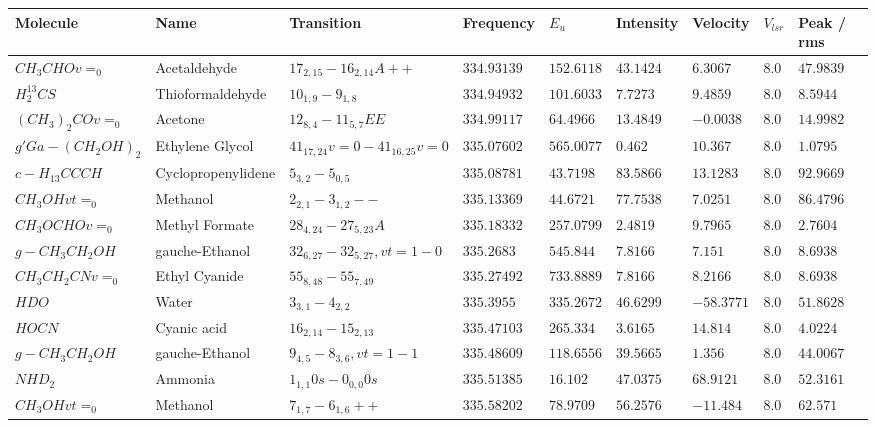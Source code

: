 \documentclass[10pt]{article}
\begin{document}
\begin{landscape}
\begin{table}[htb]
\small
    \centering    
    \begin{tabular}{l l l l l l l l l} 
\hline
Molecule & Name & Transition & Frequency & $E_{{u}}$ & Intensity & Velocity & $V_{{lsr}}$ & Peak / rms \\
\hline
$CH_{3}CHOv=_{0}$ & Acetaldehyde & $17_{2,15}-16_{2,14}A++$ & $334.93139$ & $152.6118$ & $43.1424$ & $6.3067$ & $8.0$ & $47.9839$\\
$H_{2}^{13}CS$ & Thioformaldehyde & $10_{1,9}-9_{1,8}$ & $334.94932$ & $101.6033$ & $7.7273$ & $9.4859$ & $8.0$ & $8.5944$\\
$(CH_{3})_{2}COv=_{0}$ & Acetone & $12_{8,4}-11_{5,7}EE$ & $334.99117$ & $64.4966$ & $13.4849$ & $-0.0038$ & $8.0$ & $14.9982$\\
$g'Ga-(CH_{2}OH)_{2}$ & Ethylene Glycol & $41_{17,24}v=0-41_{16,25}v=0$ & $335.07602$ & $565.0077$ & $0.462$ & $10.367$ & $8.0$ & $1.0795$\\
$c-H_{13}CCCH$ & Cyclopropenylidene & $5_{3,2}-5_{0,5}$ & $335.08781$ & $43.7198$ & $83.5866$ & $13.1283$ & $8.0$ & $92.9669$\\
$CH_{3}OHvt=_{0}$ & Methanol & $2_{2,1}-3_{1,2}--$ & $335.13369$ & $44.6721$ & $77.7538$ & $7.0251$ & $8.0$ & $86.4796$\\
$CH_{3}OCHOv=_{0}$ & Methyl Formate & $28_{4,24}-27_{5,23}A$ & $335.18332$ & $257.0799$ & $2.4819$ & $9.7965$ & $8.0$ & $2.7604$\\
$g-CH_{3}CH_{2}OH$ & gauche-Ethanol & $32_{6,27}-32_{5,27},vt=1-0$ & $335.2683$ & $545.844$ & $7.8166$ & $7.151$ & $8.0$ & $8.6938$\\
$CH_{3}CH_{2}CNv=_{0}$ & Ethyl Cyanide & $55_{8,48}-55_{7,49}$ & $335.27492$ & $733.8889$ & $7.8166$ & $8.2166$ & $8.0$ & $8.6938$\\
$HDO$ & Water & $3_{3,1}-4_{2,2}$ & $335.3955$ & $335.2672$ & $46.6299$ & $-58.3771$ & $8.0$ & $51.8628$\\
$HOCN$ & Cyanic acid & $16_{2,14}-15_{2,13}$ & $335.47103$ & $265.334$ & $3.6165$ & $14.814$ & $8.0$ & $4.0224$\\
$g-CH_{3}CH_{2}OH$ & gauche-Ethanol & $9_{4,5}-8_{3,6},vt=1-1$ & $335.48609$ & $118.6556$ & $39.5665$ & $1.356$ & $8.0$ & $44.0067$\\
$NHD_{2}$ & Ammonia & $1_{1,1}0s-0_{0,0}0s$ & $335.51385$ & $16.102$ & $47.0375$ & $68.9121$ & $8.0$ & $52.3161$\\
$CH_{3}OHvt=_{0}$ & Methanol & $7_{1,7}-6_{1,6}++$ & $335.58202$ & $78.9709$ & $56.2576$ & $-11.484$ & $8.0$ & $62.571$\\

\end{tabular}
\end{table}
\end{landscape}
\end{document}
